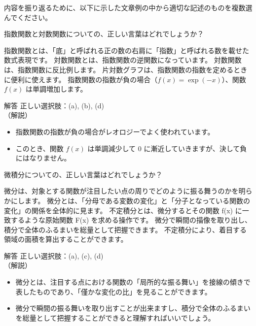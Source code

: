 \documentclass[uplatex,dvipdfmx,a4paper,11pt]{jsarticle}
\begin{document}
内容を振り返るために、以下に示した文章例の中から適切な記述のものを複数選んでください。
\begin{qlist}
	\qitem 指数関数と対数関数についての、正しい言葉はどれでしょうか？
		\begin{qlist2}
			\qitem 指数関数とは、「底」と呼ばれる正の数の右肩に「指数」と呼ばれる数を載せた数式表現です。
			\qitem 対数関数とは、指数関数の逆関数になっています。
			\qitem 対数関数は、指数関数に反比例します。
			\qitem 片対数グラフは、指数関数の指数を定めるときに便利に使えます。
			\qitem 指数関数の指数が負の場合（$f(x)=\exp(-x)$）、関数 $f(x)$ は単調増加します。
		\end{qlist2}
        \vspace{3mm}
        \begin{itembox}[l]{解答}
            正しい選択肢：(a), (b), (d)\\
            （解説）
			\begin{itemize}
				\item 指数関数の指数が負の場合がレオロジーでよく使われています。
				\item このとき、関数 $f(x)$ は単調減少して 0 に漸近していきますが、決して負にはなりません。
			\end{itemize}
        \end{itembox}
	\qitem 微積分についての、正しい言葉はどれでしょうか？
		\begin{qlist2}
			\qitem 微分は、対象とする関数が注目したい点の周りでどのように振る舞うのかを明らかにします。
			\qitem 微分とは、「分母である変数の変化」と「分子となっている関数の変化」の関係を全体的に見ます。
			\qitem 不定積分とは、微分するとその関数 f(x) に一致するような原始関数 F(x) を求める操作です。
			\qitem 微分で瞬間の描像を取り出し、積分で全体のふるまいを総量として把握できます。
			\qitem 不定積分により、着目する領域の面積を算出することができます。
		\end{qlist2}
        \vspace{3mm}
        \begin{itembox}[l]{解答}
            正しい選択肢：(a), (c), (d)\\
            （解説）
			\begin{itemize}
				\item 微分とは、注目する点における関数の「局所的な振る舞い」を接線の傾きで表したものであり、「僅かな変化の比」を見ることができます。
				\item 微分で瞬間の振る舞いを取り出すことが出来ますし、積分で全体のふるまいを総量として把握することができると理解すればいいでしょう。

\end{itemize}
\end{itembox}
\end{qlist}
\end{document}

